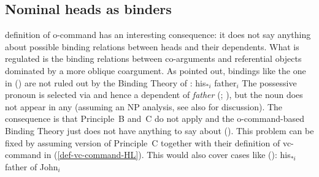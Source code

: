 \documentclass[output=paper
 	        ,biblatex
                ,babelshorthands
                ,newtxmath
                ,draftmode
                ,colorlinks, citecolor=brown
]{langscibook}
\begin{document}
\subsection{Nominal heads as binders}
\label{sec-nominal-heads-as-binders}


 definition of o-command has an interesting consequence: it does not say anything about possible
binding relations between heads and their dependents. What is regulated is the binding relations
between co-arguments and referential objects dominated by a more oblique coargument. As
\citet[]{Mueller99a} pointed out, bindings like the one in () are not ruled out by
the Binding Theory of \citet[Chapter~6]{ps2}: 
\ea
his$_{*i}$ father$_i$
\z
The possessive pronoun is selected via \spr and hence a dependent of \emph{father}
(\citealt{MuellerHeadless,MyPM2021a}; \crossrefchapteralt[\page \pageref{knjiga-avm}]{agreement}), but the noun does not appear in any \argstl (assuming an NP
analysis, see also  for discussion). The consequence is that Principle~B and~C do not apply and the o-command-based Binding Theory just
does not have anything to say about (). This problem can be fixed by assuming 
version of Principle~C together with their definition of vc-command in (\ref{def-vc-command-HL}).
This would also cover cases like ():
\ea
his$_{*i}$ father of John$_i$
\z
\end{document}
